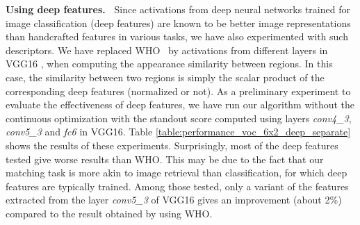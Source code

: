 \documentclass[10pt,twocolumn,letterpaper]{article}
\numberwithin{theorem}{section}
\newcommand{\parag}[1]{\vspace{4pt}\noindent\textbf{#1~}}
\begin{document}
\parag{Using deep features.}
Since activations from deep neural networks trained for image classification (deep features) are known to be better image representations than handcrafted features in various tasks, we have also experimented with such descriptors. We have replaced WHO~\cite{hariharan2012who} by activations from different layers in VGG16 \cite{Simonyan14c}, when computing the appearance similarity between regions. In this case, the similarity between two regions is simply the scalar product of the corresponding deep features (normalized or not). As a preliminary experiment to evaluate the effectiveness of deep features, we have run our algorithm without the continuous optimization with the standout score computed using layers \textit{conv4\_3}, \textit{conv5\_3} and \textit{fc6} in VGG16. 
Table \ref{table:performance_voc_6x2_deep_separate} shows the results of these experiments. Surprisingly, most of the deep features tested give worse results than WHO. This may be due to the fact that our matching task is more akin to image retrieval than classification, for which deep features are typically trained. Among those tested, only a variant of the features extracted from the layer \textit{conv5\_3} of VGG16 gives an improvement (about 2\%) compared to the result obtained by using WHO.
\end{document}
